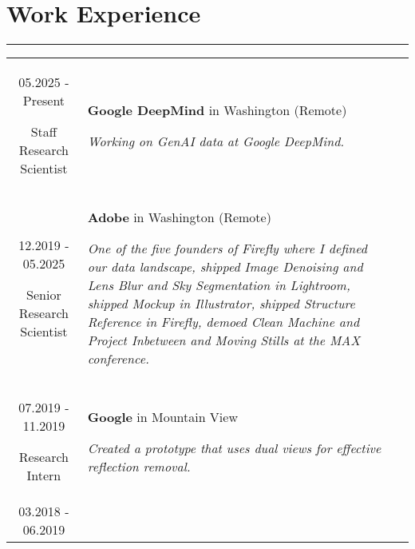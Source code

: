 \documentclass[10pt]{article}
\begin{document}
\section*{Work Experience}
\vspace{-0.3cm}
{\color{E6E6E6} \hrule height 0.04cm}
\vspace{0.4cm}
\renewcommand{\arraystretch}{1.0}
\begin{tabular}{C Z D}
	{
		05.2025 - Present
		
		\vspace{-0.05cm}
		
		{\scriptsize Staff Research Scientist}
	}
	&
	{	
		{\bf Google DeepMind} {\scriptsize in Washington (Remote)}
		
		\vspace{0.05cm}
		
		{\scriptsize \it Working on GenAI data at Google DeepMind.}
		
		\vspace{0.0cm}
	}
	\\
	{
		12.2019 - 05.2025
		
		\vspace{-0.05cm}
		
		{\scriptsize Senior Research Scientist}
	}
	&
	{	
		{\bf Adobe} {\scriptsize in Washington (Remote)}
		
		\vspace{0.05cm}
		
		{\scriptsize \it One of the five founders of Firefly where I defined our data landscape, shipped Image Denoising and Lens Blur and Sky Segmentation in Lightroom, shipped Mockup in Illustrator, shipped Structure Reference in Firefly, demoed Clean Machine and Project Inbetween and Moving Stills at the MAX conference.}
		
		\vspace{0.0cm}
	}
	\\
	{
		07.2019 - 11.2019
		
		\vspace{-0.05cm}
		
		{\scriptsize Research Intern}
	}
	&
	{	
		{\bf Google} {\scriptsize in Mountain View}
		
		\vspace{0.05cm}
		
		{\scriptsize \it Created a prototype that uses dual views for effective reflection removal.}
		
		\vspace{0.0cm}
	}
	\\
	{
		03.2018 - 06.2019
		
}
\end{tabular}
\end{document}
